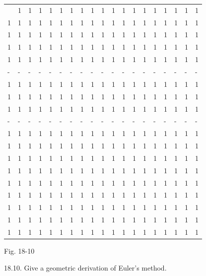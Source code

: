 \documentclass[10pt]{article}
\begin{document}
\begin{center}
\begin{tabular}{lllllllllllllllllll|}
\hline
 & 1 & 1 & 1 & 1 & 1 & 1 & 1 & 1 & 1 & 1 & 1 & 1 & 1 & 1 & 1 & 1 & 1 & 1 \\
1 & 1 & 1 & 1 & 1 & 1 & 1 & 1 & 1 & 1 & 1 & 1 & 1 & 1 & 1 & 1 & 1 & 1 & 1 \\
1 & 1 & 1 & 1 & 1 & 1 & 1 & 1 & 1 & 1 & 1 & 1 & 1 & 1 & 1 & 1 & 1 & 1 & 1 \\
1 & 1 & 1 & 1 & 1 & 1 & 1 & 1 & 1 & 1 & 1 & 1 & 1 & 1 & 1 & 1 & 1 & 1 & 1 \\
1 & 1 & 1 & 1 & 1 & 1 & 1 & 1 & 1 & 1 & 1 & 1 & 1 & 1 & 1 & 1 & 1 & 1 & 1 \\
- & - & - & - & - & - & - & - & - & - & - & - & - & - & - & - & - & - & - \\
1 & 1 & 1 & 1 & 1 & 1 & 1 & 1 & 1 & 1 & 1 & 1 & 1 & 1 & 1 & 1 & 1 & 1 & 1 \\
1 & 1 & 1 & 1 & 1 & 1 & 1 & 1 & 1 & 1 & 1 & 1 & 1 & 1 & 1 & 1 & 1 & 1 & 1 \\
1 & 1 & 1 & 1 & 1 & 1 & 1 & 1 & 1 & 1 & 1 & 1 & 1 & 1 & 1 & 1 & 1 & 1 & 1 \\
- & - & - & - & - & - & - & - & - & - & - & - & - & - & - & - & - & - & - \\
1 & 1 & 1 & 1 & 1 & 1 & 1 & 1 & 1 & 1 & 1 & 1 & 1 & 1 & 1 & 1 & 1 & 1 & 1 \\
1 & 1 & 1 & 1 & 1 & 1 & 1 & 1 & 1 & 1 & 1 & 1 & 1 & 1 & 1 & 1 & 1 & 1 & 1 \\
1 & 1 & 1 & 1 & 1 & 1 & 1 & 1 & 1 & 1 & 1 & 1 & 1 & 1 & 1 & 1 & 1 & 1 & 1 \\
1 & 1 & 1 & 1 & 1 & 1 & 1 & 1 & 1 & 1 & 1 & 1 & 1 & 1 & 1 & 1 & 1 & 1 & 1 \\
1 & 1 & 1 & 1 & 1 & 1 & 1 & 1 & 1 & 1 & 1 & 1 & 1 & 1 & 1 & 1 & 1 & 1 & 1 \\
1 & 1 & 1 & 1 & 1 & 1 & 1 & 1 & 1 & 1 & 1 & 1 & 1 & 1 & 1 & 1 & 1 & 1 & 1 \\
1 & 1 & 1 & 1 & 1 & 1 & 1 & 1 & 1 & 1 & 1 & 1 & 1 & 1 & 1 & 1 & 1 & 1 & 1 \\
1 & 1 & 1 & 1 & 1 & 1 & 1 & 1 & 1 & 1 & 1 & 1 & 1 & 1 & 1 & 1 & 1 & 1 & 1 \\
1 & 1 & 1 & 1 & 1 & 1 & 1 & 1 & 1 & 1 & 1 & 1 & 1 & 1 & 1 & 1 & 1 & 1 & 1 \\
\hline
\end{tabular}
\end{center}

Fig. 18-10

18.10. Give a geometric derivation of Euler's method.
\end{document}
